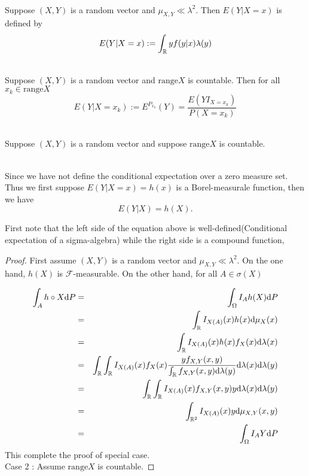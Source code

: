 \begin{example} \ \\
Suppose $(X,Y)$ is a random vector and $\mu_{X,Y} \ll \lambda^2$. Then $E(Y|X=x)$ is defined by
$$
E(Y|X=x) := \int_{\mathbb{R}} yf(y|x) \lambda(y)
$$
\end{example}

\begin{example} \ \\
Suppose $(X,Y)$ is a random vector and $\mathrm{range} X$ is countable. Then for all $x_k\in \mathrm{range} X$
$$
E(Y|X=x_k) := E^{P_{x_k}}(Y)=\frac{E(YI_{X=x_k})}{P(X=x_k)}
$$ 
\end{example}

\begin{example} \ \\
Suppose $(X,Y)$ is a random vector and suppose $\mathrm{range} X$ is countable.	
\end{example}




\begin{theorem} \ \\
Since we have not define the conditional expectation over a zero measure set. Thus we first suppose $E(Y|X=x)=h(x)$ is a Borel-measurale function, then we have
$$
E(Y|X) = h(X).
$$	
\end{theorem} \par
First note that the left side of the equation above is well-defined(Conditional expectation of a sigma-algebra) while the right side is a compound function,
\begin{proof}
First assume $(X,Y)$ is a random vector and $\mu_{X,Y} \ll \lambda^2$. On the one hand, $h(X)$ is $\mathcal F$-measurable.
On the other hand, for all $A \in \sigma(X)$

\begin{eqnarray*}
\int_A h\circ X \mathrm{d} P &=& \int_\Omega I_A h(X) \mathrm{d} P	\\
&=& \int_{\mathbb{R}} I_{X(A)}(x)h(x) \mathrm{d} \mu_X(x) \\
&=& \int_{\mathbb{R}} I_{X(A)}(x)h(x)f_X(x) \mathrm{d} \lambda(x) \\
&=& \int_{\mathbb{R}} \int_{\mathbb{R}} I_{X(A)}(x)f_X(x)\frac{yf_{X,Y}(x,y)}{\int_{\mathbb{R}}f_{X,Y}(x,y)\mathrm{d} \lambda(y)}\mathrm{d}\lambda(x) \mathrm{d} \lambda(y) \\
&=& \int_{\mathbb{R}} \int_{\mathbb{R}} I_{X(A)}(x)f_{X,Y}(x,y)y \mathrm{d} \lambda(x) \mathrm{d} \lambda(y) \\ 
&=& \int_{\mathbb{R}^2} I_{X(A)}(x)y\mathrm{d} \mu_{X,Y}(x,y) \\
&=& \int_\Omega I_A Y\mathrm{d} P
\end{eqnarray*}
This complete the proof of special case. \\
Case 2 : Assume $\mathrm{range} X$ is countable. 
\end{proof}



